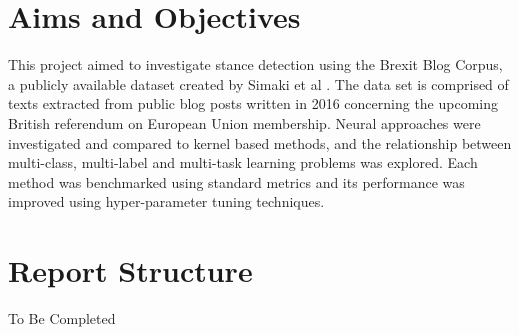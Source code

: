 \documentclass[Dissertation.tex]{subfiles}
\begin{document}
\begin{comment}
In such politically turbulent times there is significant interest in applying machine learning and natural language processing (NLP) techniques to political social media content, such as opinion mining and sentiment analysis. This project considers the related task of stance detection, which in the simplest case involves determining if a text in agreement or disagreement with a given proposition. As one of the most significant and polarizing political events in a generation, the Brexit debate is an ideal topic for investigating stance detection.
\end{comment}

\section{Aims and Objectives}
This project aimed to investigate stance detection using the Brexit Blog Corpus, a publicly available dataset created by Simaki et al \cite{simakiAnnotatingSpeakerStance2017}. The data set is comprised of texts extracted from public blog posts written in 2016 concerning the upcoming British referendum on European Union membership. Neural approaches were investigated and compared to kernel based methods, and the relationship between multi-class, multi-label and multi-task learning problems was explored. Each method was benchmarked using standard metrics and its performance was improved using hyper-parameter tuning techniques.

\section{Report Structure}
To Be Completed

\end{document}
